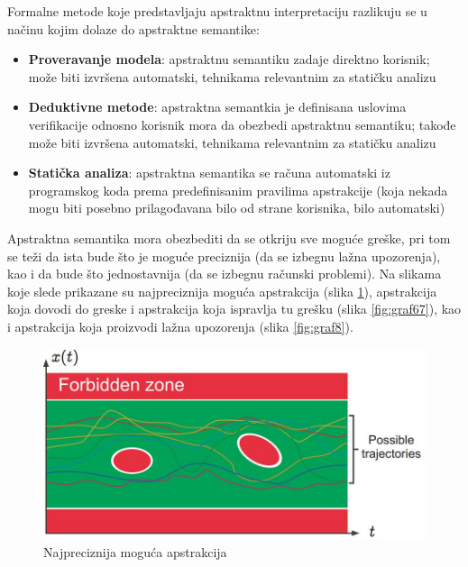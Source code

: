 \documentclass[a4paper]{article}
\begin{document}
Formalne metode koje predstavljaju apstraktnu interpretaciju razlikuju se u načinu kojim dolaze do apstraktne semantike: 
\begin{itemize}
    \item \textbf{Proveravanje modela}: apstraktnu semantiku zadaje direktno korisnik; može biti izvršena automatski, tehnikama relevantnim za statičku analizu
    \item \textbf{Deduktivne metode}: apstraktna semantkia je definisana uslovima verifikacije odnosno korisnik mora da obezbedi apstraktnu semantiku; takođe može biti izvršena automatski, tehnikama relevantnim za statičku analizu
    \item \textbf{Statička analiza}: apstraktna semantika se računa automatski iz programskog koda prema predefinisanim pravilima apstrakcije (koja nekada mogu biti posebno prilagođavana bilo od strane korisnika, bilo automatski)
\end{itemize} 

Apstraktna semantika mora obezbediti da se otkriju sve moguće greške, pri tom se teži da ista bude što je moguće preciznija (da se izbegnu lažna upozorenja), kao i da bude što jednostavnija (da se izbegnu računski problemi). Na slikama koje slede prikazane su najpreciznija moguća apstrakcija (slika \ref{fig:graf5}), apstrakcija koja dovodi do greske i apstrakcija koja ispravlja tu grešku (slika \ref{fig:graf67}), kao i apstrakcija koja proizvodi lažna upozorenja (slika \ref{fig:graf8}).

\begin{figure}[h!]
\begin{center}
\includegraphics[scale=0.3]{graf5.JPG}
\end{center}
\caption{Najpreciznija moguća apstrakcija}
\label{fig:graf5}
\end{figure}
\end{document}
